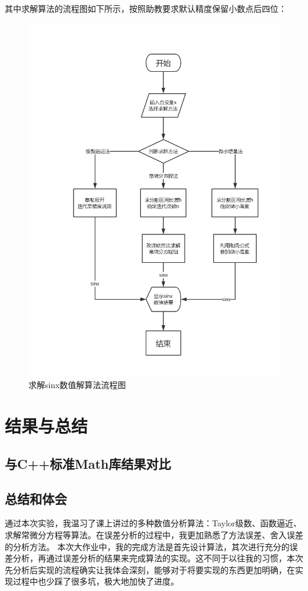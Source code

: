 \documentclass[UTF8]{ctexart}
\begin{document}
其中求解算法的流程图如下所示，按照助教要求默认精度保留小数点后四位：
\begin{figure}[H]
    \centering
    \includegraphics[scale=0.4]{images/procedure.png}
    \caption{求解sinx数值解算法流程图}
\end{figure}

\section{结果与总结}

\subsection{与C++标准Math库结果对比}

\subsection{总结和体会}
通过本次实验，我温习了课上讲过的多种数值分析算法：Taylor级数、函数逼近、求解常微分方程等算法。在误差分析的过程中，我更加熟悉了方法误差、舍入误差的分析方法。
本次大作业中，我的完成方法是首先设计算法，其次进行充分的误差分析，再通过误差分析的结果来完成算法的实现。这不同于以往我的习惯，本次先分析后实现的流程确实让我体会深刻，能够对于将要实现的东西更加明确，在实现过程中也少踩了很多坑，极大地加快了进度。
\end{document}
